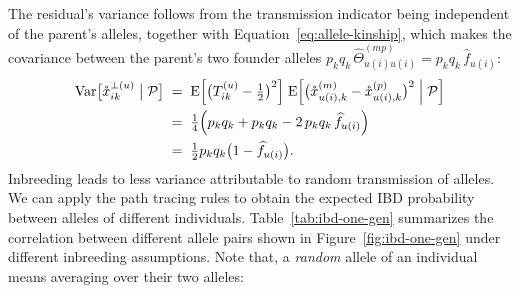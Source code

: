 \documentclass[12pt]{article}
\numberwithin{equation}{section}
\begin{document}
The residual's variance follows from the transmission indicator being independent of the parent's alleles, together with Equation~\eqref{eq:allele-kinship}, which makes the covariance between the parent's two founder alleles $p_k q_k\,\widehat\Theta^{(mp)}_{u(i)u(i)} = p_k q_k\,\widehat{f}_{u(i)}$:
\begin{equation}\label{eq:founder-resid-var}
\begin{aligned}
    \mathrm{Var}\big[\mathring{x}^{\perp(u)}_{ik} \;\big|\; \mathcal{P}\big]
    \;&=\; \mathrm{E}\Big[\big(T^{(u)}_{ik} - \tfrac12\big)^2\Big]\; \mathrm{E}\Big[\big(\mathring{x}^{(m)}_{u(i),k} - \mathring{x}^{(p)}_{u(i),k}\big)^2 \;\Big|\; \mathcal{P}\Big] \\
    \;&=\; \tfrac14 \Big(p_k q_k + p_k q_k - 2\, p_k q_k\, \widehat{f}_{u(i)}\Big) \\
    \;&=\; \tfrac12 p_k q_k \big(1 - \widehat{f}_{u(i)}\big) .
\end{aligned}
\end{equation}
Inbreeding leads to less variance attributable to random transmission of alleles.
We can apply the path tracing rules to obtain the expected IBD probability between alleles of different individuals.
Table~\ref{tab:ibd-one-gen} summarizes the correlation between different allele pairs shown in Figure~\ref{fig:ibd-one-gen} under different inbreeding assumptions.
Note that, a \emph{random} allele of an individual means averaging over their two alleles:
\end{document}
